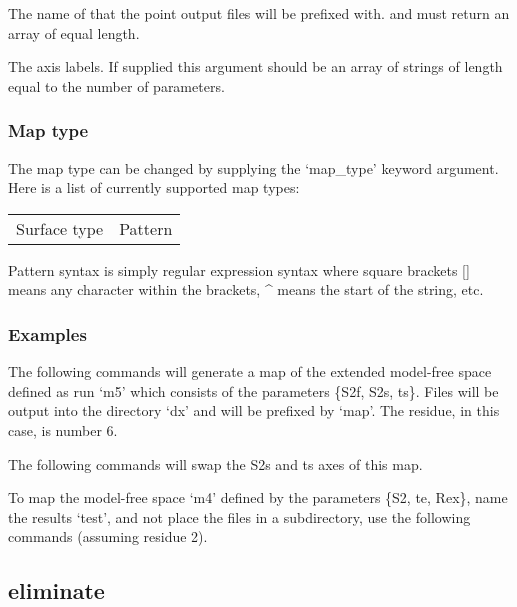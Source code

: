   The name of that the point output files will be prefixed with.
and must return an array of equal length.

  The axis labels.  If supplied this argument should be an array of strings of length equal to the number of parameters.

\subsubsection{Map type}

The map type can be changed by supplying the `map\_type' keyword argument.  Here is a list of
currently supported map types:


\begin{tabular}{cc}
Surface type & Pattern \\
\end{tabular}

Pattern syntax is simply regular expression syntax where square brackets [] means any
character within the brackets, \^{} means the start of the string, etc.


\subsubsection{Examples}

The following commands will generate a map of the extended model-free space defined as run
`m5' which consists of the parameters \{S2f, S2s, ts\}.  Files will be output into the
directory `dx' and will be prefixed by `map'.  The residue, in this case, is number 6.




The following commands will swap the S2s and ts axes of this map.



To map the model-free space `m4' defined by the parameters \{S2, te, Rex\}, name the results
`test', and not place the files in a subdirectory, use the following commands (assuming
residue 2).




\newpage

\subsection{eliminate}


